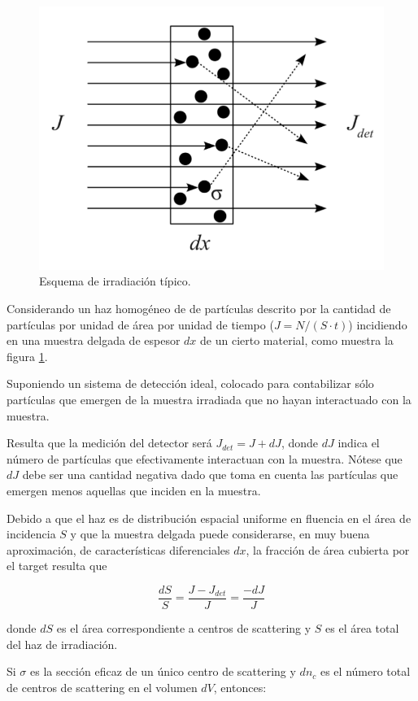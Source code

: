 \begin{figure}
 \centering
 \includegraphics[width = .75\textwidth]{figures/cap8/irrad.png}
 \caption{Esquema de irradiación típico.}
 \label{figirrad}
\end{figure}

Considerando un haz homogéneo de de partículas descrito por la cantidad de partículas por unidad de área por unidad de tiempo ($J = N/ (S \cdot t)$) incidiendo en una muestra delgada de espesor $dx$ de un cierto material, como muestra la figura \ref{figirrad}.

Suponiendo un sistema de detección ideal, colocado para contabilizar sólo partículas que emergen de la muestra irradiada que no hayan interactuado con la muestra.

Resulta que la medición del detector será $J_{det} = J + dJ$, donde $dJ$ indica el número de partículas que efectivamente interactuan con la muestra. Nótese que $dJ$ debe ser una cantidad negativa dado que toma en cuenta las partículas que emergen menos aquellas que inciden en la muestra. 

Debido a que el haz es de distribución espacial uniforme en fluencia en el área de incidencia $S$ y que la muestra delgada puede considerarse, en muy buena aproximación, de características diferenciales $dx$, la fracción de área cubierta por el target resulta que

\begin{equation}
 \frac{dS}{S} = \frac{J - J_{det}}{J} = \frac{-dJ}{J}
\end{equation}

\noindent
donde $dS$ es el área correspondiente a centros de scattering y $S$ es el área total del haz de irradiación.

Si $\sigma$ es la sección eficaz de un único centro de scattering y $dn_{c}$ es el número total de centros de scattering en el volumen $dV$, entonces:

